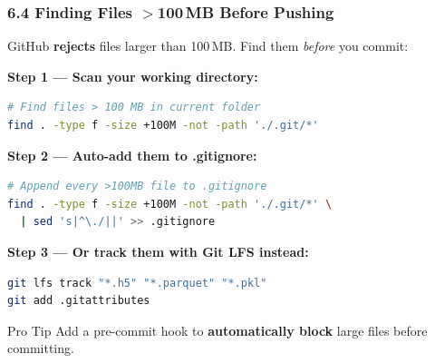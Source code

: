 \documentclass{beamer}
\begin{document}

\begin{frame}[fragile]
\frametitle{6.4 Finding Files $>$100\,MB Before Pushing}

GitHub \textbf{rejects} files larger than 100\,MB. Find them \textit{before} you commit:

\textbf{Step 1 --- Scan your working directory:}
\begin{lstlisting}[language=bash]
# Find files > 100 MB in current folder
find . -type f -size +100M -not -path './.git/*'
\end{lstlisting}

\textbf{Step 2 --- Auto-add them to .gitignore:}
\begin{lstlisting}[language=bash]
# Append every >100MB file to .gitignore
find . -type f -size +100M -not -path './.git/*' \
  | sed 's|^\./||' >> .gitignore
\end{lstlisting}

\textbf{Step 3 --- Or track them with Git LFS instead:}
\begin{lstlisting}[language=bash]
git lfs track "*.h5" "*.parquet" "*.pkl"
git add .gitattributes
\end{lstlisting}

\begin{block}{Pro Tip}
Add a pre-commit hook to \textbf{automatically block} large files before committing.
\end{block}
\end{frame}
\end{document}
